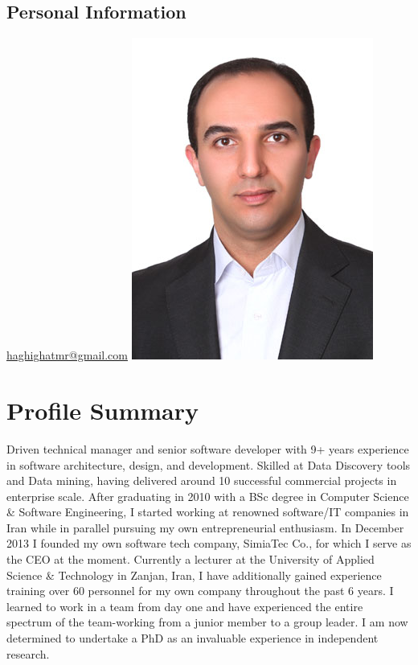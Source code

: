 \documentclass[10pt,a4paper,sans]{moderncv} %
\begin{document}
	\makecvtitle %
	\vspace{-15mm}
    \begin{multicols}{2}
	    \section{Personal Information}
	        {
	            \href{mailto:haghighatmr@gmail.com}{haghighatmr@gmail.com}
	        }
            \hspace{6cm}
            \includegraphics[width=.28\linewidth]{MRH}
    \end{multicols}
    \section{Profile Summary}
	    \cvitem{}
	    {
	        Driven technical manager and senior software developer with 9+ years experience in software architecture, design, and development. Skilled at Data Discovery tools and Data mining, having delivered around 10 successful commercial projects in enterprise scale. After graduating in 2010 with a BSc degree in Computer Science \& Software Engineering, I started working at renowned software/IT companies in Iran while in parallel pursuing my own entrepreneurial enthusiasm. In December 2013 I founded my own software tech company, SimiaTec Co., for which I serve as the CEO at the moment. Currently a lecturer at the University of Applied Science \& Technology in Zanjan, Iran, I have additionally gained experience training over 60 personnel for my own company throughout the past 6 years. I learned to work in a team from day one and have experienced the entire spectrum of the team-working from a junior member to a group leader. I am now determined to undertake a PhD as an invaluable experience in independent research. 
	    }
\end{document}
